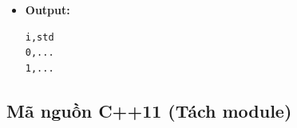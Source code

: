 \begin{itemize}
\begin{itemize}
        \item \textbf{Module 3 (Ghi file CSV):}
        \begin{itemize}
            \item File \texttt{rolling\_std.csv}
            \item Header: \texttt{i,std}
        \end{itemize}
    \end{itemize}

    \item \textbf{Output:}
\begin{lstlisting}
i,std
0,...
1,...
\end{lstlisting}
\end{itemize}

\subsection{Mã nguồn C++11 (Tách module)}

